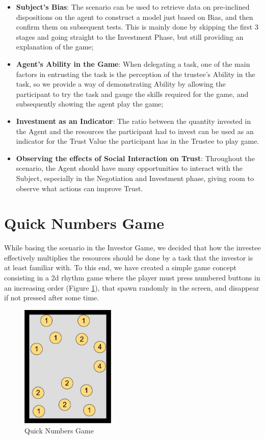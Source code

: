 \begin{itemize}
    \item \textbf{Subject's Bias}: The scenario can be used to retrieve data on pre-inclined dispositions on the agent to construct a model just based on Bias, and then confirm them on subsequent tests. This is mainly done by skipping the first 3 stages and going straight to the Investment Phase, but still providing an explanation of the game;
    \item \textbf{Agent's Ability in the Game}: When delegating a task, one of the main factors in entrusting the task is the perception of the trustee's Ability in the task, so we provide a way of demonstrating Ability by allowing the participant to try the task and gauge the skills required for the game, and subsequently showing the agent play the game;
    \item \textbf{Investment as an Indicator}: The ratio between the quantity invested in the Agent and the resources the participant had to invest can be used as an indicator for the Trust Value the participant has in the Trustee to play game.
    \item \textbf{Observing the effects of Social Interaction on Trust}: Throughout the scenario, the Agent should have many opportunities to interact with the Subject, especially in the Negotiation and Investment phase, giving room to observe what actions can improve Trust.
\end{itemize}


\section{Quick Numbers Game}
\label{sec:QuickNumbersGame}
While basing the scenario in the Investor Game, we decided that how the investee effectively multiplies the resources should be done by a task that the investor is at least familiar with. To this end, we have created a simple game concept consisting in a 2d rhythm game where the player must press numbered buttons in an increasing order (Figure \ref{fig:QuickNumbersGame}), that spawn randomly in the screen, and disappear if not pressed after some time.

\begin{figure}[hbt]
    \centering
    \includegraphics[width=0.4\textwidth]{figures/FallingBoltsDiagram.png}
    \caption{Quick Numbers Game}
    \label{fig:QuickNumbersGame}
\end{figure}

